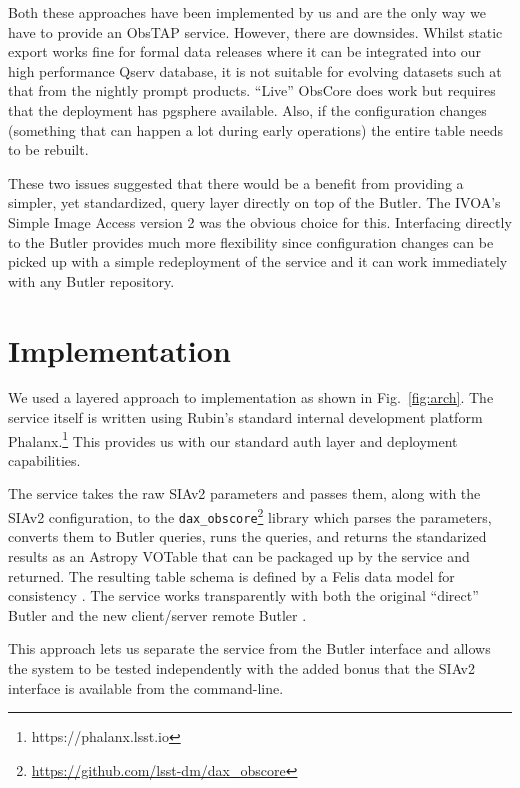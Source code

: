 \documentclass[11pt,twoside]{article}
\begin{document}
Both these approaches have been implemented by us and are the only way we have to provide an ObsTAP service. However, there are downsides.
Whilst static export works fine for formal data releases where it can be integrated into our high performance Qserv database, it is not suitable for evolving datasets such at that from the nightly prompt products.
``Live'' ObsCore does work but requires that the deployment has pgsphere available. Also, if the configuration changes (something that can happen a lot during early operations) the entire table needs to be rebuilt.

These two issues suggested that there would be a benefit from providing a simpler, yet standardized, query layer directly on top of the Butler. The IVOA's Simple Image Access version 2 \citep[SIAv2;][]{2015ivoa.spec.1223D} was the obvious choice for this. Interfacing directly to the Butler provides much more flexibility since configuration changes can be picked up with a simple redeployment of the service and it can work immediately with any Butler repository.

\section{Implementation}


We used a layered approach to implementation as shown in Fig.\ \ref{fig:arch}.
The service itself \citep{SQR-095} is written using Rubin's standard internal development platform Phalanx.\footnote{https://phalanx.lsst.io}
This provides us with our standard auth layer and deployment capabilities.

The service takes the raw SIAv2 parameters and passes them, along with the SIAv2 configuration, to the \texttt{dax\_obscore}\footnote{\url{https://github.com/lsst-dm/dax_obscore}} library which parses the parameters, converts them to Butler queries, runs the queries, and returns the standarized results as an Astropy VOTable that can be packaged up by the service and returned.
The resulting table schema is defined by a Felis data model for consistency \citep{C702_adassxxxiv}.
The service works transparently with both the original ``direct'' Butler and the new client/server remote Butler \citep{2024SPIE13101E..3GJ}.

This approach lets us separate the service from the Butler interface and allows the system to be tested independently with the added bonus that the SIAv2 interface is available from the command-line.
\end{document}
